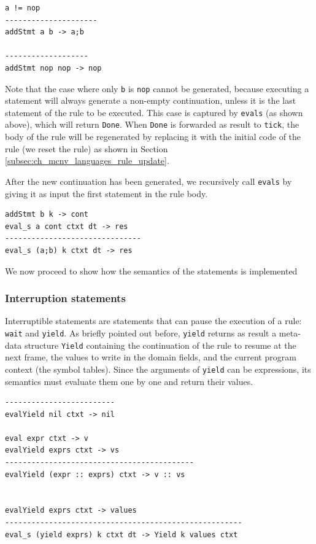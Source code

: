 \begin{lstlisting}
a != nop
---------------------
addStmt a b -> a;b

-------------------
addStmt nop nop -> nop
\end{lstlisting}

\noindent
Note that the case where only \texttt{b} is \texttt{nop} cannot be generated, because executing a statement will always generate a non-empty continuation, unless it is the last statement of the rule to be executed. This case is captured by \texttt{eval\tu s} (as shown above), which will return \texttt{Done}. When \texttt{Done} is forwarded as result to \texttt{tick}, the body of the rule will be regenerated by replacing it with the initial code of the rule (we reset the rule) as shown in Section \ref{subsec:ch_mcnv_languages_rule_update}.

After the new continuation has been generated, we recursively call \texttt{eval\tu s} by giving it as input the first statement in the rule body.

\begin{lstlisting}
addStmt b k -> cont
eval_s a cont ctxt dt -> res
-------------------------------
eval_s (a;b) k ctxt dt -> res
\end{lstlisting}

We now proceed to show how the semantics of the statements is implemented

\subsubsection{Interruption statements}
Interruptible statements are statements that can pause the execution of a rule: \texttt{wait} and \texttt{yield}. As briefly pointed out before, \texttt{yield} returns as result a meta-data structure \texttt{Yield} containing the continuation of the rule to resume at the next frame, the values to write in the domain fields, and the current program context (the symbol tables). Since the arguments of \texttt{yield} can be expressions, its semantics must evaluate them one by one and return their values.

\begin{lstlisting}
-------------------------
evalYield nil ctxt -> nil

eval expr ctxt -> v
evalYield exprs ctxt -> vs
-------------------------------------------
evalYield (expr :: exprs) ctxt -> v :: vs


evalYield exprs ctxt -> values
------------------------------------------------------
eval_s (yield exprs) k ctxt dt -> Yield k values ctxt
\end{lstlisting}

